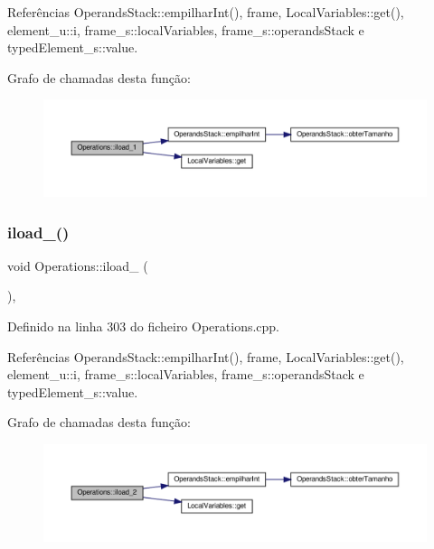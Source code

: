 Referências Operands\+Stack\+::empilhar\+Int(), frame, Local\+Variables\+::get(), element\+\_\+u\+::i, frame\+\_\+s\+::local\+Variables, frame\+\_\+s\+::operands\+Stack e typed\+Element\+\_\+s\+::value.

Grafo de chamadas desta função\+:\nopagebreak
\begin{figure}[H]
\begin{center}
\leavevmode
\includegraphics[width=350pt]{classOperations_a4b9d8ef21894c0db2203c06712e97765_cgraph}
\end{center}
\end{figure}
\mbox{\label{classOperations_affa5afeadb98117ea0ee66cf2687eb0a}} 
\subsubsection{\texorpdfstring{iload\+\_()}{iload\_2()}}
{\footnotesize\ttfamily void Operations\+::iload\+\_ (\begin{DoxyParamCaption}{ }\end{DoxyParamCaption})\hspace{0.3cm}{\ttfamily [static]}, {\ttfamily [private]}}



Definido na linha 303 do ficheiro Operations.\+cpp.



Referências Operands\+Stack\+::empilhar\+Int(), frame, Local\+Variables\+::get(), element\+\_\+u\+::i, frame\+\_\+s\+::local\+Variables, frame\+\_\+s\+::operands\+Stack e typed\+Element\+\_\+s\+::value.

Grafo de chamadas desta função\+:\nopagebreak
\begin{figure}[H]
\begin{center}
\leavevmode
\includegraphics[width=350pt]{classOperations_affa5afeadb98117ea0ee66cf2687eb0a_cgraph}
\end{center}
\end{figure}
\mbox{\label{classOperations_a3f645534291129289ee71c708dbe633c}} 
